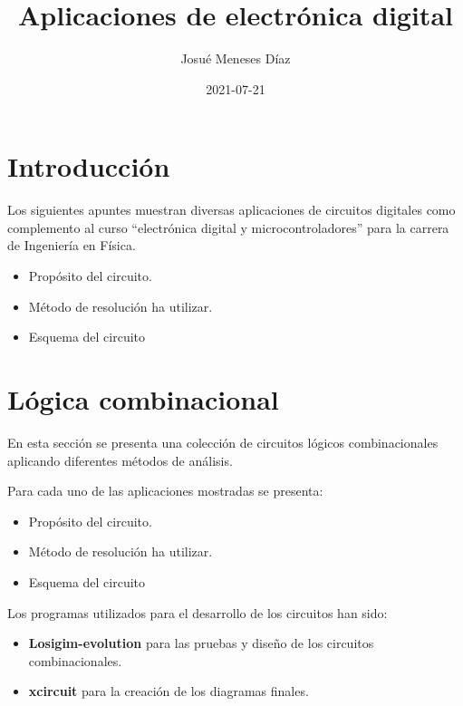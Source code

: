 \documentclass[
]{book}
\title{Aplicaciones de electrónica digital}
\author{Josué Meneses Díaz}
\date{2021-07-21}
\providecommand{\tightlist}{%
  \setlength{\itemsep}{0pt}\setlength{\parskip}{0pt}}
\begin{document}
\maketitle

{
\setcounter{tocdepth}{1}
\tableofcontents
}
\listoftables
\listoffigures
\hypertarget{introducciuxf3n}{%
\chapter{Introducción}\label{introducciuxf3n}}

Los siguientes apuntes muestran diversas aplicaciones de circuitos digitales como complemento al curso ``electrónica digital y microcontroladores'' para la carrera de Ingeniería en Física.

\begin{itemize}
\tightlist
\item
  Propósito del circuito.
\item
  Método de resolución ha utilizar.
\item
  Esquema del circuito
\end{itemize}

\hypertarget{intro}{%
\chapter{Lógica combinacional}\label{intro}}

En esta sección se presenta una colección de circuitos lógicos combinacionales aplicando diferentes métodos de análisis.

Para cada uno de las aplicaciones mostradas se presenta:

\begin{itemize}
\tightlist
\item
  Propósito del circuito.
\item
  Método de resolución ha utilizar.
\item
  Esquema del circuito
\end{itemize}

Los programas utilizados para el desarrollo de los circuitos han sido:

\begin{itemize}
\tightlist
\item
  \textbf{Losigim-evolution} para las pruebas y diseño de los circuitos combinacionales.
\item
  \textbf{xcircuit} para la creación de los diagramas finales.
\end{itemize}
\end{document}
